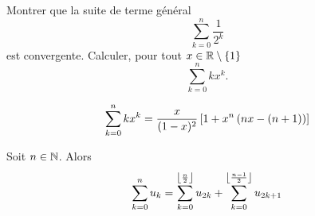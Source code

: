 \documentclass{magnolia}
\begin{document}
\begin{exos}
\exo Montrer que la suite de terme général
  \[\sum_{k=0}^n \frac{1}{2^k}\]
  est convergente.
\exo Calculer, pour tout $x\in\mathbb{R}\setminus\left\{1\right\}$
  \[\sum_{k=0}^n k x^k.\]
  \begin{sol}
\[\sum_{k=0}^n k x^k=\frac{x}{(1-x)^2}\left[1+x^n\left(nx-(n+1)\right)\right]\]
  \end{sol}
\end{exos}

\begin{proposition}
Soit $n\in\mathbb{N}$. Alors
  \[\sum_{k=0}^n u_k=\sum_{k=0}^{\left\lfloor\frac{n}{2}\right\rfloor} u_{2k}+
    \sum_{k=0}^{\left\lfloor\frac{n-1}{2}\right\rfloor} u_{2k+1}\]
\end{proposition}

\end{document}
